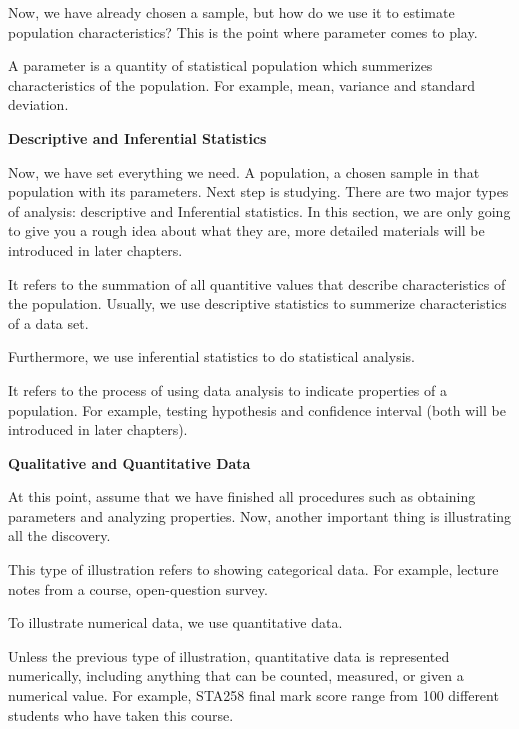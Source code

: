 Now, we have already chosen a sample, but how do we use it to estimate population characteristics? This is the point where parameter comes to play.

\begin{definition}
A parameter is a quantity of statistical population which summerizes characteristics of the population. For example, mean, variance and standard deviation.
\end{definition}

\textbf{Descriptive and Inferential Statistics}

Now, we have set everything we need. A population, a chosen sample in that population with its parameters. Next step is studying. There are two major types of analysis: descriptive and Inferential statistics. In this section, we are only going to give you a rough idea about what they are, more detailed materials will be introduced in later chapters.

\begin{definition}
It refers to the summation of all quantitive values that describe characteristics of the population. Usually, we use descriptive statistics to summerize characteristics of a data set.
\end{definition}

Furthermore, we use inferential statistics to do statistical analysis.

\begin{definition}
It refers to the process of using data analysis to indicate properties of a population. For example, testing hypothesis and confidence interval (both will be introduced in later chapters).
\end{definition}

\textbf{Qualitative and Quantitative Data}

At this point, assume that we have finished all procedures such as obtaining parameters and analyzing properties. Now, another important thing is illustrating all the discovery. 

\begin{definition}
This type of illustration refers to showing categorical data. For example, lecture notes from a course, open-question survey. 
\end{definition}

To illustrate numerical data, we use quantitative data.

\begin{definition}
Unless the previous type of illustration, quantitative data is represented numerically, including anything that can be counted, measured, or given a numerical value. For example, STA258 final mark score range from 100 different students who have taken this course.
\end{definition}

